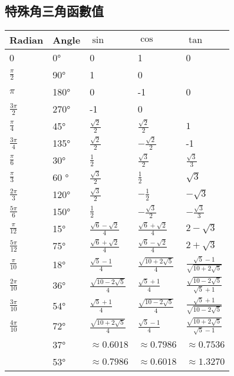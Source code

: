 \documentclass[a4paper,12pt]{report}
\begin{document}
\subsection{特殊角三角函數值}
\renewcommand{\arraystretch}{1.5}
\begin{longtable}[c]{|p{}|p{}|p{}|p{}|p{}|}
\hline
Radian & Angle & $\sin$ & $\cos$ & $\tan$ \\\hline\endhead
0 & 0° & 0 & 1 & 0 \\\hline
$\frac{\pi}{2}$ & 90° & 1 & 0 & \\\hline
$\pi$ & 180° & 0 & -1 & 0 \\\hline
$\frac{3\pi}{2}$ & 270° & -1 & 0 & \\\hline
$\frac{\pi}{4}$ & 45° & $\frac{\sqrt{2}}{2}$ & $\frac{\sqrt{2}}{2}$ & $1$ \\\hline
$\frac{3\pi}{4}$ & 135° & $\frac{\sqrt{2}}{2}$ & $-\frac{\sqrt{2}}{2}$ & -1 \\\hline
$\frac{\pi}{6}$ & 30° & $\frac{1}{2}$ & $\frac{\sqrt{3}}{2}$ & $\frac{\sqrt{3}}{3}$ \\\hline
$\frac{\pi}{3}$ & 60 ° & $\frac{\sqrt{3}}{2}$ & $\frac{1}{2}$ & $\sqrt{3}$ \\\hline
$\frac{2\pi}{3}$ & 120° & $\frac{\sqrt{3}}{2}$ & $-\frac{1}{2}$ & $-\sqrt{3}$ \\\hline
$\frac{5\pi}{6}$ & 150° & $\frac{1}{2}$ & $-\frac{\sqrt{3}}{2}$ & $-\frac{\sqrt{3}}{3}$ \\\hline
$\frac{\pi}{12}$ & 15° & $\frac{\sqrt{6}-\sqrt{2}}{4}$ & $\frac{\sqrt{6}+\sqrt{2}}{4}$ & $2-\sqrt{3}$ \\\hline
$\frac{5\pi}{12}$ & 75° & $\frac{\sqrt{6}+\sqrt{2}}{4}$ & $\frac{\sqrt{6}-\sqrt{2}}{4}$ & $2+\sqrt{3}$ \\\hline
$\frac{\pi}{10}$ & 18° & $\frac{\sqrt{5}-1}{4}$ & $\frac{\sqrt{10+2\sqrt{5}}}{4}$ & $\frac{\sqrt{5}-1}{\sqrt{10+2\sqrt{5}}}$ \\\hline
$\frac{2\pi}{10}$ & 36° & $\frac{\sqrt{10-2\sqrt{5}}}{4}$ & $\frac{\sqrt{5}+1}{4}$ & $\frac{\sqrt{10-2\sqrt{5}}}{\sqrt{5}+1}$ \\\hline
$\frac{3\pi}{10}$ & 54° & $\frac{\sqrt{5}+1}{4}$ & $\frac{\sqrt{10-2\sqrt{5}}}{4}$ & $\frac{\sqrt{5}+1}{\sqrt{10-2\sqrt{5}}}$ \\\hline
$\frac{4\pi}{10}$ & 72° & $\frac{\sqrt{10+2\sqrt{5}}}{4}$ & $\frac{\sqrt{5}-1}{4}$ & $\frac{\sqrt{10+2\sqrt{5}}}{\sqrt{5}-1}$ \\\hline
& 37° & $\approx 0.6018$ & $\approx 0.7986$ & $\approx 0.7536$ \\\hline
& 53° & $\approx 0.7986$ & $\approx 0.6018$ & $\approx 1.3270$ \\\hline
\end{longtable}
\end{document}
